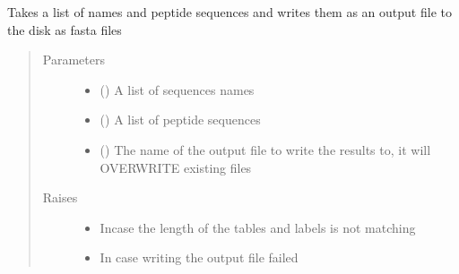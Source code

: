 \documentclass[letterpaper,10pt,english]{sphinxmanual}
\begin{document}
\begin{fulllineitems}
\label{\detokenize{IPTK.IO:IPTK.IO.OutFunctions.write_named_peptides_to_fasta}}
Takes a list of names and peptide sequences and writes them as an output file to the disk as fasta files
\begin{quote}\begin{description}
\item[{Parameters}] \leavevmode\begin{itemize}
\item {} 
 () \textendash{} A list of sequences names

\item {} 
 () \textendash{} A list of peptide sequences

\item {} 
 () \textendash{} The name of the output file to write the results to, it will OVERWRITE existing files

\end{itemize}

\item[{Raises}] \leavevmode\begin{itemize}
\item {} 
 \textendash{} Incase the length of the tables and labels is not matching

\item {} 
 \textendash{} In case writing the output file failed

\end{itemize}

\end{description}\end{quote}

\end{fulllineitems}
\end{document}
